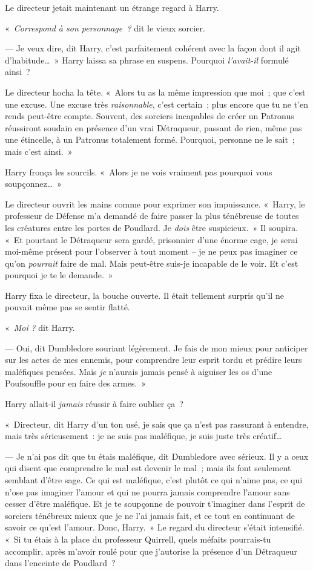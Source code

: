 Le directeur jetait maintenant un étrange regard à Harry.

«~\emph{Correspond à son personnage~?} dit le vieux sorcier.

--- Je veux dire, dit Harry, c'est parfaitement cohérent avec la façon dont il agit d'habitude…~» Harry laissa sa phrase en suspens. Pourquoi \emph{l'avait-il} formulé ainsi~?

Le directeur hocha la tête. «~Alors tu as la même impression que moi~; que c'est une excuse. Une excuse très \emph{raisonnable}, c'est certain~; plus encore que tu ne t'en rends peut-être compte. Souvent, des sorciers incapables de créer un Patronus réussiront soudain en présence d'un vrai Détraqueur, passant de rien, même pas une étincelle, à un Patronus totalement formé. Pourquoi, personne ne le sait~; mais c'est ainsi.~»

Harry fronça les sourcils. «~Alors je ne vois vraiment pas pourquoi vous soupçonnez…~»

Le directeur ouvrit les mains comme pour exprimer son impuissance. «~Harry, le professeur de Défense m'a demandé de faire passer la plus ténébreuse de toutes les créatures entre les portes de Poudlard. Je \emph{dois} être suspicieux.~» Il soupira. «~Et pourtant le Détraqueur sera gardé, prisonnier d'une énorme cage, je serai moi-même présent pour l'observer à tout moment -- je ne peux pas imaginer ce qu'on \emph{pourrait} faire de mal. Mais peut-être suis-je incapable de le voir. Et c'est pourquoi je te le demande.~»

Harry fixa le directeur, la bouche ouverte. Il était tellement surpris qu'il ne pouvait même pas se sentir flatté.

«~\emph{Moi} \emph{?} dit Harry.

--- Oui, dit Dumbledore souriant légèrement. Je fais de mon mieux pour anticiper sur les actes de mes ennemis, pour comprendre leur esprit tordu et prédire leurs maléfiques pensées. Mais \emph{je} n'aurais jamais pensé à aiguiser les os d'une Poufsouffle pour en faire des armes.~»

Harry allait-il \emph{jamais} réussir à faire oublier ça~?

«~Directeur, dit Harry d'un ton usé, je sais que ça n'est pas rassurant à entendre, mais très sérieusement~: je ne suis pas maléfique, je suis juste très créatif…

--- Je n'ai pas dit que tu étais maléfique, dit Dumbledore avec sérieux. Il y a ceux qui disent que comprendre le mal est devenir le mal~; mais ils font seulement semblant d'être sage. Ce qui est maléfique, c'est plutôt ce qui n'aime pas, ce qui n'ose pas imaginer l'amour et qui ne pourra jamais comprendre l'amour sans cesser d'être maléfique. Et je te soupçonne de pouvoir t'imaginer dans l'esprit de sorciers ténébreux mieux que je ne l'ai jamais fait, et ce tout en continuant de savoir ce qu'est l'amour. Donc, Harry.~» Le regard du directeur s'était intensifié. «~Si tu étais à la place du professeur Quirrell, quels méfaits pourrais-tu accomplir, après m'avoir roulé pour que j'autorise la présence d'un Détraqueur dans l'enceinte de Poudlard~?

